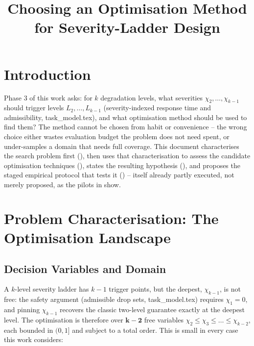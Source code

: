 \documentclass{article}
\title{Choosing an Optimisation Method for Severity-Ladder Design}
\author{}
\date{}
\begin{document}
\maketitle

\begin{center}
\end{center}

\section{Introduction}

Phase 3 of this work asks: for $k$ degradation levels, what severities
$\chi_2, \dots, \chi_{k-1}$ should trigger levels $L_2, \dots, L_{k-1}$
(severity-indexed response time and admissibility, task\_model.tex), and what
optimisation method should be used to find them? The method cannot be chosen from habit or
convenience -- the wrong choice either wastes evaluation budget the problem
does not need spent, or under-samples a domain that needs full coverage. This
document characterises the search problem first (), then
uses that characterisation to assess the candidate optimisation techniques
(), states the resulting hypothesis
(), and proposes the staged empirical protocol that
tests it () -- itself already partly executed, not merely
proposed, as the pilots in  show.

\section{Problem Characterisation: The Optimisation Landscape}
\label{sec:landscape}

\subsection{Decision Variables and Domain}

A $k$-level severity ladder has $k - 1$ trigger points, but the deepest,
$\chi_{k-1}$, is not free: the safety argument (admissible drop sets,
task\_model.tex) requires $\chi_1 = 0$, and pinning $\chi_{k-1}$ recovers the
classic two-level guarantee exactly at the deepest level. The optimisation is therefore over $\mathbf{k - 2}$ free variables
$\chi_2 \leq \chi_3 \leq \dots \leq \chi_{k-2}$, each bounded in $(0, 1]$ and
subject to a total order. This is small in every case this work considers:
\end{document}
